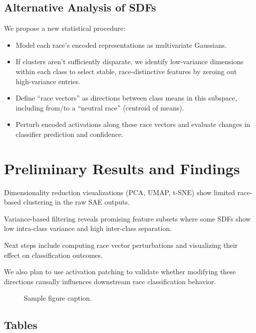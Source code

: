 \documentclass{article}
\begin{document}
\subsection{Alternative Analysis of SDFs}
We propose a new statistical procedure:
\begin{itemize}
\item Model each race’s encoded representations as multivariate Gaussians.
\item If clusters aren't sufficiently disparate, we identify low-variance dimensions within each class to select stable, race-distinctive features by zeroing out high-variance entries.
\item Define “race vectors” as directions between class means in this subspace, including from/to a “neutral race” (centroid of means).
\item Perturb encoded activations along these race vectors and evaluate changes in classifier prediction and confidence.
\end{itemize}

\section{Preliminary Results and Findings}
Dimensionality reduction visualizations (PCA, UMAP, t-SNE) show limited race-based clustering in the raw SAE outputs.

Variance-based filtering reveals promising feature subsets where some SDFs show low intra-class variance and high inter-class separation.

Next steps include computing race vector perturbations and visualizing their effect on classification outcomes.

We also plan to use activation patching to validate whether modifying these directions causally influences downstream race classification behavior.






\begin{figure}
  \centering
  \fbox{\rule[-.5cm]{0cm}{4cm} \rule[-.5cm]{4cm}{0cm}}
  \caption{Sample figure caption.}
\end{figure}


\subsection{Tables}
\end{document}

